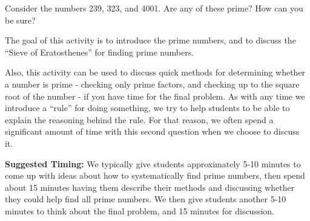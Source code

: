 \documentclass[nooutcomes]{ximera}
\begin{document}
\begin{problem}
Consider the numbers 239, 323, and 4001. Are any of these prime? How
can you be sure?
\end{problem}


\newpage
\begin{instructorNotes}
The goal of this activity is to introduce the prime numbers, and to discuss the ``Sieve of Eratosthenes'' for finding prime numbers.

Also, this activity can be used to discuss quick methods for determining whether a number is prime - checking only prime factors, and checking up to the square root of the number - if you have time for the final problem. As with any time we introduce a ``rule'' for doing something, we try to help students to be able to explain the reasoning behind the rule.  For that reason, we often spend a significant amount of time with this second question when we choose to discuss it.

{\bf Suggested Timing:} We typically give students approximately 5-10 minutes to come up with ideas about how to systematically find prime numbers, then spend about 15 minutes having them describe their methods and discussing whether they could help find all prime numbers.  We then give students another 5-10 minutes to think about the final problem, and 15 minutes for discussion.
\end{instructorNotes}
\end{document}
